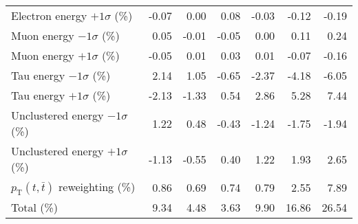 \begin{table}[htbp]
{\begin{tabular}{lrrrrrr}
Electron energy $+1\sigma$ (\%) & -0.07 & 0.00 & 0.08 & -0.03 & -0.12 & -0.19 \\ 
Muon energy $-1\sigma$ (\%) & 0.05 & -0.01 & -0.05 & 0.00 & 0.11 & 0.24 \\ 
Muon energy $+1\sigma$ (\%) & -0.05 & 0.01 & 0.03 & 0.01 & -0.07 & -0.16 \\ 
Tau energy $-1\sigma$ (\%) & 2.14 & 1.05 & -0.65 & -2.37 & -4.18 & -6.05 \\ 
Tau energy $+1\sigma$ (\%) & -2.13 & -1.33 & 0.54 & 2.86 & 5.28 & 7.44 \\ 
Unclustered energy $-1\sigma$ (\%) & 1.22 & 0.48 & -0.43 & -1.24 & -1.75 & -1.94 \\ 
Unclustered energy $+1\sigma$ (\%) & -1.13 & -0.55 & 0.40 & 1.22 & 1.93 & 2.65 \\ 
$p_\mathrm{T}(t,\bar{t})$ reweighting (\%) & 0.86 & 0.69 & 0.74 & 0.79 & 2.55 & 7.89 \\ 
\hline 
Total (\%) & 9.34  & 4.48  & 3.63  & 9.90  & 16.86  & 26.54 \\ 
\hline 
\end{tabular}
}
\end{table}
